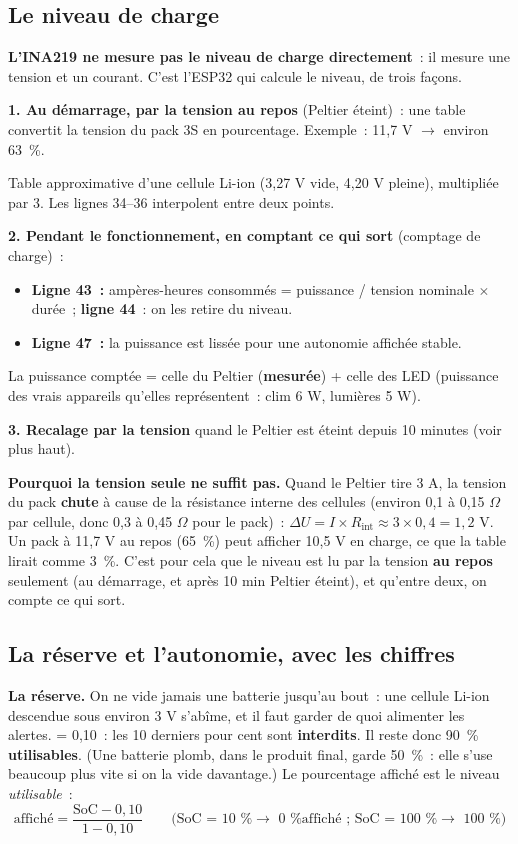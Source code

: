 \subsection{Le niveau de charge}
\textbf{L'INA219 ne mesure pas le niveau de charge directement}~: il mesure une tension et un courant. C'est l'ESP32 qui calcule le niveau, de trois façons.

\textbf{1. Au démarrage, par la tension au repos} (Peltier éteint)~: une table convertit la tension du pack 3S en pourcentage. Exemple~: 11,7 V $\rightarrow$ environ 63~\%.

{\small Table approximative d'une cellule Li-ion (3,27 V vide, 4,20 V pleine), multipliée par 3. Les lignes 34--36 interpolent entre deux points.}

\textbf{2. Pendant le fonctionnement, en comptant ce qui sort} (comptage de charge)~:

\begin{itemize}
  \item \textbf{Ligne 43~:} ampères-heures consommés = puissance / tension nominale $\times$ durée~; \textbf{ligne 44}~: on les retire du niveau.
  \item \textbf{Ligne 47~:} la puissance est lissée pour une autonomie affichée stable.
\end{itemize}
La puissance comptée = celle du Peltier (\textbf{mesurée}) + celle des LED (puissance des vrais appareils qu'elles représentent~: clim 6 W, lumières 5 W).

\textbf{3. Recalage par la tension} quand le Peltier est éteint depuis 10 minutes (voir plus haut).

\textbf{Pourquoi la tension seule ne suffit pas.} Quand le Peltier tire 3 A, la tension du pack \textbf{chute} à cause de la résistance interne des cellules (environ 0,1 à 0,15 $\Omega$ par cellule, donc 0,3 à 0,45 $\Omega$ pour le pack)~: $\Delta U = I \times R_{\text{int}} \approx 3 \times 0{,}4 = 1{,}2$ V. Un pack à 11,7 V au repos (65~\%) peut afficher 10,5 V en charge, ce que la table lirait comme 3~\%. C'est pour cela que le niveau est lu par la tension \textbf{au repos} seulement (au démarrage, et après 10 min Peltier éteint), et qu'entre deux, on compte ce qui sort.


\subsection{La réserve et l'autonomie, avec les chiffres}
\textbf{La réserve.} On ne vide jamais une batterie jusqu'au bout~: une cellule Li-ion descendue sous environ 3 V s'abîme, et il faut garder de quoi alimenter les alertes.  = 0,10~: les 10 derniers pour cent sont \textbf{interdits}. Il reste donc 90~\% \textbf{utilisables}. (Une batterie plomb, dans le produit final, garde 50~\%~: elle s'use beaucoup plus vite si on la vide davantage.) Le pourcentage affiché est le niveau \emph{utilisable}~:
\[ \text{affiché} = \frac{\mathrm{SoC} - 0{,}10}{1 - 0{,}10} \qquad\text{(SoC = 10~\% $\rightarrow$ 0~\% affiché~; SoC = 100~\% $\rightarrow$ 100~\%)} \]

